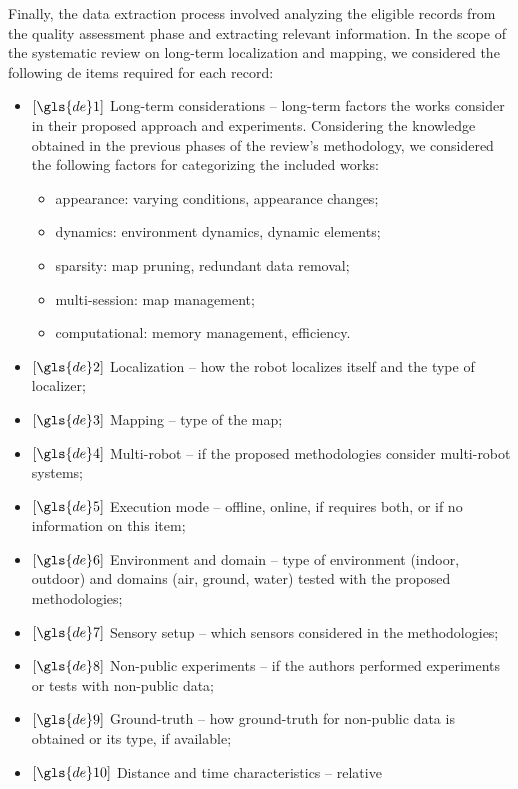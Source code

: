 Finally, the data extraction process involved analyzing the eligible records
from the quality assessment phase and extracting relevant information.
In the scope of the systematic review on long-term localization and mapping,
we considered the following \gls{de} items required for each record:
\begin{itemize}
\item $\left[\gls{de}1\right]$ Long-term considerations -- long-term factors the works
consider in their proposed approach and experiments. Considering the knowledge
obtained in the previous phases of the review's methodology,
we considered the following factors for categorizing the included works:
  \begin{itemize}
  \item appearance: varying conditions, appearance changes;
  \item dynamics: environment dynamics, dynamic elements;
  \item sparsity: map pruning, redundant data removal;
  \item multi-session: map management;
  \item computational: memory management, efficiency.
  \end{itemize}
\item $\left[\gls{de}2\right]$ Localization -- how the robot localizes itself
and the type of localizer;
\item $\left[\gls{de}3\right]$ Mapping -- type of the map;
\item $\left[\gls{de}4\right]$ Multi-robot -- if the proposed methodologies
consider multi-robot systems;
\item $\left[\gls{de}5\right]$ Execution mode -- offline, online, if requires
both, or if no information on this item;
\item $\left[\gls{de}6\right]$ Environment and domain -- type of environment
(indoor, outdoor) and domains (air, ground, water) tested with
the proposed methodologies;
\item $\left[\gls{de}7\right]$ Sensory setup -- which sensors considered in the
methodologies;
\item $\left[\gls{de}8\right]$ Non-public experiments -- if the authors
performed experiments or tests with non-public data;
\item $\left[\gls{de}9\right]$ Ground-truth -- how ground-truth for non-public
data is obtained or its type, if available;
\item $\left[\gls{de}10\right]$ Distance and time characteristics -- relative

\end{itemize}
